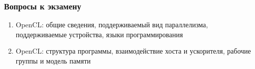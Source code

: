 \documentclass[
    aspectratio=169,
]{beamer}
\begin{document}
\begin{frame}
    \frametitle{Вопросы к экзамену}

    \begin{enumerate}
        \item OpenCL: общие сведения, поддерживаемый вид параллелизма, поддерживаемые устройства, языки программирования
        \item OpenCL: структура программы, взаимодействие хоста и ускорителя, рабочие группы и модель памяти
    \end{enumerate}

\end{frame}
\end{document}
